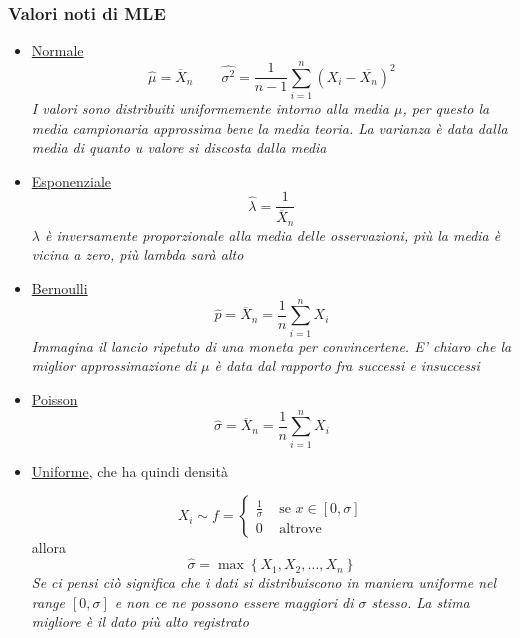 \subsubsection*{Valori noti di MLE}
\begin{itemize}
	\item \underline{Normale}
	      \[
		      \hat{\mu } = \overline{X}_n  \quad \quad \hat{\sigma ^2 } = \frac{1}{n-1} \sum_{i=1}^{n} \left(X_i - \overline{X_n}\right)^2
	      \]
	      \textit{I valori sono distribuiti uniformemente intorno alla media $ \mu  $, per questo la media campionaria approssima bene la media teoria. La varianza è data dalla media di quanto u valore si discosta dalla media}
	\item \underline{Esponenziale}
	      \[
		      \hat{\lambda } = \frac{1}{\overline{X}_n}
	      \]
	      \textit{$ \lambda $ è inversamente proporzionale alla media delle osservazioni, più la media è vicina a zero, più lambda sarà alto}
	\item \underline{Bernoulli}
	      \[
		      \hat{p} = \overline{X} _n = \frac{1}{n} \sum_{i=1}^{n} X_i
	      \]
	      \textit{Immagina il lancio ripetuto di una moneta per convincertene. E' chiaro che la miglior approssimazione di $ \mu  $ è data dal rapporto fra successi e insuccessi}
	\item \underline{Poisson}
	      \[
		      \hat{\sigma }  = \overline{X} _n = \frac{1}{n} \sum_{i=1}^{n} X_i
	      \]
	\item \underline{Uniforme}, che ha quindi densità

	      \[
		      X_i \sim f = \begin{cases}
			      \frac{1}{\sigma } & \text{ se } x \in \left[0, \sigma \right] \\
			      0                 & \text{ altrove }
		      \end{cases}
	      \]
	      allora
	      \[
		      \hat{\sigma } = \operatorname{max} \left\{X_1, X_2,\ldots ,X_n\right\}
	      \]
	      \textit{Se ci pensi ciò significa che i dati si distribuiscono in maniera uniforme nel range $ \left[0, \sigma \right] $ e non ce ne possono essere maggiori di $ \sigma  $ stesso. La stima migliore è il dato più alto registrato}
\end{itemize}
